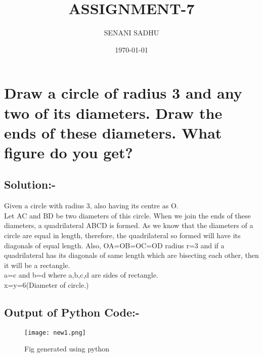 \documentclass[a4paper,12pt]{article}
\title{ASSIGNMENT-7}
\author{SENANI SADHU}
\date{\today}
\begin{document}
		\maketitle
	\newpage
	\section{Draw a circle of radius 3 and any two of its
		diameters. Draw the ends of these diameters.
		What figure do you get?}
	\subsection{Solution:-}
	Given a circle with radius 3, also having its centre as O.\\
	 Let AC and BD be two diameters of this circle. When we join the ends of these diameters, a quadrilateral ABCD is formed.
	As we know that the diameters of a circle are equal in length, therefore, the quadrilateral so formed will have its diagonals of equal length.
	Also, OA=OB=OC=OD radius r=3 and if a quadrilateral has its diagonals of same length which are bisecting each other, then it will be a rectangle.\\
	a=c and b=d where a,b,c,d are sides of rectangle.\\
	x=y=6(Diameter of circle.)
	\begin{center}
	\end{center}
\subsection{Output of Python Code:-}
\begin{figure}[htp]
	\centering
	\texttt{[image: new1.png]}
	\caption{Fig generated using python}
\end{figure}
\end{document}
